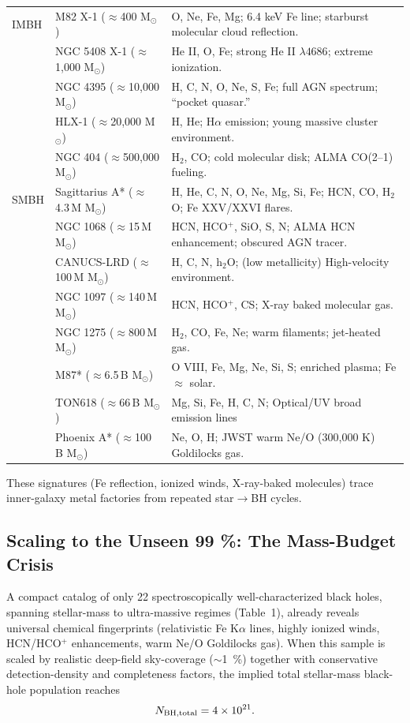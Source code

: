 \documentclass[12pt]{article}
\begin{document}
\begin{table}[H]
\begin{tabular}{l l p{7.5cm}}
\midrule
IMBH & M82 X-1 ($\approx$400 M$_\odot$) & O, Ne, Fe, Mg; 6.4 keV Fe line; starburst molecular cloud reflection. \\
& NGC 5408 X-1 ($\approx$1,000 M$_\odot$) & He II, O, Fe; strong He II $\lambda4686$; extreme ionization. \\
& NGC 4395 ($\approx$10,000 M$_\odot$) & H, C, N, O, Ne, S, Fe; full AGN spectrum; “pocket quasar.” \\
& HLX-1 ($\approx$20,000 M$_\odot$) & H, He; H$\alpha$ emission; young massive cluster environment. \\
& NGC 404 ($\approx$500,000 M$_\odot$) & H$_2$, CO; cold molecular disk; ALMA CO(2--1) fueling. \\
\midrule
SMBH & Sagittarius A* ($\approx$4.3\,M M$_\odot$) & H, He, C, N, O, Ne, Mg, Si, Fe; HCN, CO, H$_2$O; Fe XXV/XXVI flares. \\
& NGC 1068 ($\approx$15\,M M$_\odot$) & HCN, HCO$^+$, SiO, S, N; ALMA HCN enhancement; obscured AGN tracer. \\
& CANUCS-LRD ($\approx$100\,M M$_\odot$) & H, C, N, h$_2$O; (low metallicity) High-velocity environment. \\
& NGC 1097 ($\approx$140\,M M$_\odot$) & HCN, HCO$^+$, CS; X-ray baked molecular gas. \\
& NGC 1275 ($\approx$800\,M M$_\odot$) & H$_2$, CO, Fe, Ne; warm filaments; jet-heated gas. \\
& M87* ($\approx$6.5\,B M$_\odot$) & O VIII, Fe, Mg, Ne, Si, S; enriched plasma; Fe $\approx$ solar. \\
& TON618 ($\approx$66\,B M$_\odot$) & Mg, Si, Fe, H, C, N; Optical/UV broad emission lines \\
& Phoenix A* ($\approx$100\,B M$_\odot$) & Ne, O, H; JWST warm Ne/O (300,000 K) Goldilocks gas. \\
\bottomrule
\end{tabular}
\label{tab:22objects}
\end{table}

These signatures (Fe reflection, ionized winds, X-ray-baked molecules) trace inner-galaxy metal factories from repeated star$\to$BH cycles.

\subsection{Scaling to the Unseen 99 \%: The Mass-Budget Crisis}

A compact catalog of only 22 spectroscopically well-characterized black holes, spanning stellar-mass to ultra-massive regimes (Table~1), already reveals universal chemical fingerprints (relativistic Fe K$\alpha$ lines, highly ionized winds, HCN/HCO$^+$ enhancements, warm Ne/O Goldilocks gas). When this sample is scaled by realistic deep-field sky-coverage ($\sim$1~\%) together with conservative detection-density and completeness factors, the implied total stellar-mass black-hole population reaches
\[
N_{\rm BH,total} = 4 \times 10^{21}.
\]
\end{document}
